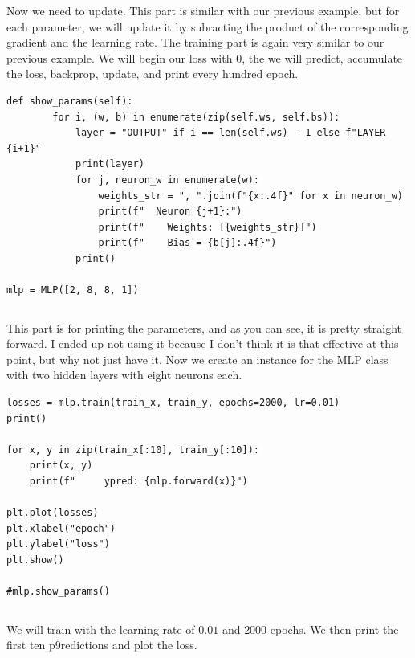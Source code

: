 \documentclass[../../main.tex]{subfiles}
\begin{document}
Now we need to update. This part is similar with our previous
example, but for each parameter, we will update it by subracting the
product of the corresponding gradient and the learning rate.
The training part is again very similar to our previous example.
We will begin our loss with $0$, the we will predict, accumulate the
loss, backprop, update, and print every hundred epoch.

\begin{jupyter}
\begin{lstlisting}[style=jin]
    def show_params(self):
        for i, (w, b) in enumerate(zip(self.ws, self.bs)):
            layer = "OUTPUT" if i == len(self.ws) - 1 else f"LAYER {i+1}"
            print(layer)
            for j, neuron_w in enumerate(w):
                weights_str = ", ".join(f"{x:.4f}" for x in neuron_w)
                print(f"  Neuron {j+1}:")
                print(f"    Weights: [{weights_str}]")
                print(f"    Bias = {b[j]:.4f}")
            print()

mlp = MLP([2, 8, 8, 1])
\end{lstlisting}
\begin{lstlisting}[style=jout]
\end{lstlisting}
\end{jupyter}

This part is for printing the parameters, and as you can see, it is
pretty straight forward. I ended up not using it because I don't think
it is that effective at this point, but why not just have it.
Now we create an instance for the MLP class with two hidden layers
with eight neurons each.

\begin{jupyter}
\begin{lstlisting}[style=jin]
losses = mlp.train(train_x, train_y, epochs=2000, lr=0.01)
print()

for x, y in zip(train_x[:10], train_y[:10]):
    print(x, y)
    print(f"     ypred: {mlp.forward(x)}")

plt.plot(losses)
plt.xlabel("epoch")
plt.ylabel("loss")
plt.show()

#mlp.show_params()
\end{lstlisting}
\begin{lstlisting}[style=jout]
\end{lstlisting}
\end{jupyter}

We will train with the learning rate of $0.01$ and $2000$ epochs.
We then print the first ten p9redictions and plot the loss.
\end{document}
